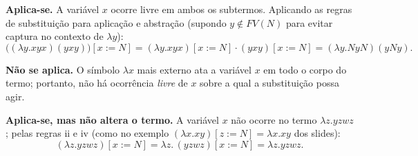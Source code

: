 
\begin{solution}
\begin{Qlist}
\item[(a)] \textbf{Aplica-se.} A variável $x$ ocorre livre em ambos os subtermos.
Aplicando as regras de substituição para aplicação e abstração
(supondo $y\notin FV(N)$ para evitar captura no contexto de $\lambda y$):
\[
    \bigl((\lambda y.xyx)(yxy)\bigr)[x:=N]
    = (\lambda y.xyx)[x:=N]\cdot(yxy)[x:=N]
    = (\lambda y.NyN)(yNy).
\]

\item[(b)] \textbf{Não se aplica.} O símbolo $\lambda x$ mais externo ata a variável
$x$ em todo o corpo do termo; portanto, não há ocorrência \emph{livre} de $x$ sobre
a qual a substituição possa agir.

\item[(c)] \textbf{Aplica-se, mas não altera o termo.} A variável $x$ não ocorre
no termo $\lambda z.yzwz$; pelas regras ii e iv (como no exemplo
$(\lambda x.xy)[z:=N]=\lambda x.xy$ dos slides):
\[
    (\lambda z.yzwz)[x:=N] = \lambda z.\,(yzwz)[x:=N] = \lambda z.yzwz.
\]
\end{Qlist}
\end{solution}


